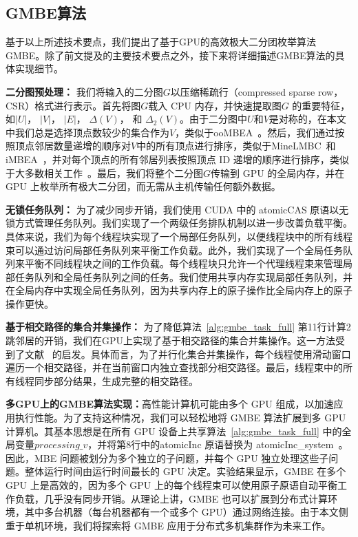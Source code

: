 

\subsection{GMBE算法}

基于以上所述技术要点，我们提出了基于GPU的高效极大二分团枚举算法GMBE。除了前文提及的主要技术要点之外，接下来将详细描述GMBE算法的具体实现细节。

\textbf{二分图预处理：} 我们将输入的二分图$G$以压缩稀疏行（compressed sparse row，CSR）格式进行表示。首先将图$G$载入 CPU 内存，并快速提取图$G$ 的重要特征，如$|U|$， $|V|$， $|E|$， 
$\Delta(V)$， 和 $\Delta_2(V)$。由于二分图中$U$和$V$是对称的，在本文中我们总是选择顶点数较少的集合作为$V$，类似于ooMBEA~\cite{ooMBE22}。然后，我们通过按照顶点邻居数量递增的顺序对$V$中的所有顶点进行排序，类似于MineLMBC~\cite{minel06}和iMBEA~\cite{iMBEA14}，并对每个顶点的所有邻居列表按照顶点 ID 递增的顺序进行排序，类似于大多数相关工作~\cite{g2miner22,Kclique22}。最后，我们将整个二分图$G$传输到 GPU 的全局内存，并在 GPU 上枚举所有极大二分团，而无需从主机传输任何额外数据。

\textbf{无锁任务队列：} 为了减少同步开销，我们使用 CUDA 中的 \textsf{atomicCAS} 原语以无锁方式管理任务队列。我们实现了一个两级任务排队机制以进一步改善负载平衡。具体来说，我们为每个线程块实现了一个局部任务队列，以便线程块中的所有线程束可以通过访问局部任务队列来平衡工作负载。此外，我们实现了一个全局任务队列来平衡不同线程块之间的工作负载。每个线程块只允许一个代理线程束来管理局部任务队列和全局任务队列之间的任务。我们使用共享内存实现局部任务队列，并在全局内存中实现全局任务队列，因为共享内存上的原子操作比全局内存上的原子操作更快。

\textbf{基于相交路径的集合并集操作：} 为了降低算法~\ref{alg:gmbe_task_full} 第11行计算2跳邻居的开销，我们在GPU上实现了基于相交路径的集合并集操作。这一方法受到了文献~\cite{GpuMergePathIntersect14} 的启发。具体而言，为了并行化集合并集操作，每个线程使用滑动窗口遍历一个相交路径，并在当前窗口内独立查找部分相交路径。最后，线程束中的所有线程同步部分结果，生成完整的相交路径。

\textbf{多GPU上的GMBE算法实现：}高性能计算机可能由多个 GPU 组成，以加速应用执行性能。为了支持这种情况，我们可以轻松地将 GMBE 算法扩展到多 GPU 计算机。其基本思想是在所有 GPU 设备上共享算法~\ref{alg:gmbe_task_full} 中的全局变量$processing\_v$，并将第8行中的\textsf{atomicInc} 原语替换为 \textsf{atomicInc\_system}~\cite{CUDAProgrammingGuide}。因此，MBE 问题被划分为多个独立的子问题，并每个 GPU 独立处理这些子问题。整体运行时间由运行时间最长的 GPU 决定。实验结果显示，GMBE 在多个 GPU 上是高效的，因为多个 GPU 上的每个线程束可以使用原子原语自动平衡工作负载，几乎没有同步开销。从理论上讲，GMBE 也可以扩展到分布式计算环境，其中多台机器（每台机器都有一个或多个 GPU）通过网络连接。由于本文侧重于单机环境，我们将探索将 GMBE 应用于分布式多机集群作为未来工作。


